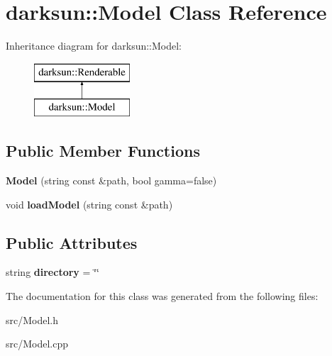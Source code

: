 \hypertarget{classdarksun_1_1_model}{}\section{darksun\+::Model Class Reference}
\label{classdarksun_1_1_model}
Inheritance diagram for darksun\+::Model\+:\begin{figure}[H]
\begin{center}
\leavevmode
\includegraphics[height=2.000000cm]{classdarksun_1_1_model}
\end{center}
\end{figure}
\subsection*{Public Member Functions}
\begin{DoxyCompactItemize}
\item 
\mbox{\label{classdarksun_1_1_model_a981434e3782fb49b53806493a030bfc3}} 
{\bfseries Model} (string const \&path, bool gamma=false)
\item 
\mbox{\label{classdarksun_1_1_model_a1033e3ef04119cd665593b9bf1679850}} 
void {\bfseries load\+Model} (string const \&path)
\end{DoxyCompactItemize}
\subsection*{Public Attributes}
\begin{DoxyCompactItemize}
\item 
\mbox{\label{classdarksun_1_1_model_a67b1721104cbf47bf1ab455cf6f500a1}} 
string {\bfseries directory} = \char`\"{}\char`\"{}
\end{DoxyCompactItemize}


The documentation for this class was generated from the following files\+:\begin{DoxyCompactItemize}
\item 
src/Model.\+h\item 
src/Model.\+cpp\end{DoxyCompactItemize}
